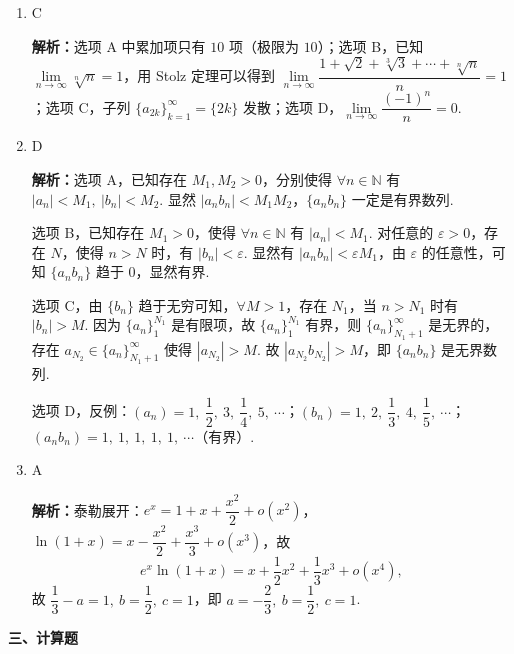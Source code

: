\documentclass[a4paper,11pt]{ctexart}
\begin{document}
\begin{enumerate}[label=\arabic*., leftmargin=2em, itemsep=0.7em, topsep=0.4em]
  \item C

  \textbf{解析：}选项 A 中累加项只有 $10$ 项（极限为 $10$）；选项 B，已知 $\lim\limits_{n\to\infty}\sqrt[n]{n}=1$，用 Stolz 定理可以得到 $\lim\limits_{n\to\infty}\dfrac{1+\sqrt{2}+\sqrt[3]{3}+\cdots+\sqrt[n]{n}}{n}=1$；选项 C，子列 $\{a_{2k}\}_{k=1}^\infty=\{2k\}$ 发散；选项 D，$\lim\limits_{n\to\infty}\dfrac{(-1)^n}{n}=0$.

  \item D

  \textbf{解析：}选项 A，已知存在 $M_1,M_2>0$，分别使得 $\forall n\in\mathbb{N}$ 有 $|a_n|<M_1,\ |b_n|<M_2$. 显然 $|a_nb_n|<M_1M_2$，$\{a_nb_n\}$ 一定是有界数列.

  选项 B，已知存在 $M_1>0$，使得 $\forall n\in\mathbb{N}$ 有 $|a_n|<M_1$. 对任意的 $\varepsilon>0$，存在 $N$，使得 $n>N$ 时，有 $|b_n|<\varepsilon$. 显然有 $|a_nb_n|<\varepsilon M_1$，由 $\varepsilon$ 的任意性，可知 $\{a_nb_n\}$ 趋于 $0$，显然有界.

  选项 C，由 $\{b_n\}$ 趋于无穷可知，$\forall M>1$，存在 $N_1$，当 $n>N_1$ 时有 $|b_n|>M$. 因为 $\{a_n\}_1^{N_1}$ 是有限项，故 $\{a_n\}_1^{N_1}$ 有界，则 $\{a_n\}_{N_1+1}^\infty$ 是无界的，存在 $a_{N_2}\in\{a_n\}_{N_1+1}^\infty$ 使得 $|a_{N_2}|>M$. 故 $|a_{N_2}b_{N_2}|>M$，即 $\{a_nb_n\}$ 是无界数列.

  选项 D，反例：$(a_n)=1,\ \dfrac{1}{2},\ 3,\ \dfrac{1}{4},\ 5,\ \cdots$；$(b_n)=1,\ 2,\ \dfrac{1}{3},\ 4,\ \dfrac{1}{5},\ \cdots$；$(a_nb_n)=1,\ 1,\ 1,\ 1,\ 1,\ \cdots$（有界）.

  \item A

  \textbf{解析：}泰勒展开：$e^x=1+x+\dfrac{x^2}{2}+o(x^2)$，$\ln(1+x)=x-\dfrac{x^2}{2}+\dfrac{x^3}{3}+o(x^3)$，故
  \[
    e^x\ln(1+x)=x+\frac{1}{2}x^2+\frac{1}{3}x^3+o(x^4),
  \]
  故 $\dfrac{1}{3}-a=1,\ b=\dfrac{1}{2},\ c=1$，即 $a=-\dfrac{2}{3},\ b=\dfrac{1}{2},\ c=1$.
\end{enumerate}

\vspace{0.6em}
\textbf{三、计算题}
\end{document}
